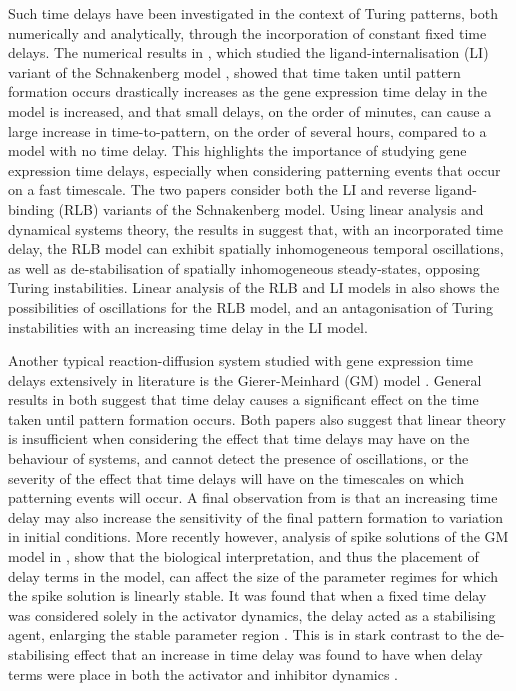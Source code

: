 Such time delays have been investigated in the context of Turing patterns, both numerically and analytically, through the incorporation of constant fixed time delays. The numerical results in \cite{gaffmonk}, which studied the ligand-internalisation (LI) variant of the Schnakenberg model \cite{schnakenberg}, showed that time taken until pattern formation occurs drastically increases as the gene expression time delay in the model is increased, and that small delays, on the order of minutes, can cause a large increase in time-to-pattern, on the order of several hours, compared to a model with no time delay. This highlights the importance of studying gene expression time delays, especially when considering patterning events that occur on a fast timescale. The two papers \cite{jiang, yigaffneyli} consider both the LI and reverse ligand-binding (RLB) variants of the Schnakenberg model. Using linear analysis and dynamical systems theory, the results in \cite{jiang} suggest that, with an incorporated time delay, the RLB model can exhibit spatially inhomogeneous temporal oscillations, as well as de-stabilisation of spatially inhomogeneous steady-states, opposing Turing instabilities. Linear analysis of the RLB and LI models in \cite{yigaffneyli} also shows the possibilities of oscillations for the RLB model, and an antagonisation of Turing instabilities with an increasing time delay in the LI model.

Another typical reaction-diffusion system studied with gene expression time delays extensively in literature is the Gierer-Meinhard (GM) model \cite{gm}.
General results in both \cite{leegaffney,leegaffmonk} suggest that time delay causes a significant effect on the time taken until pattern formation occurs. Both papers also suggest that linear theory is insufficient when considering the effect that time delays may have on the behaviour of systems, and cannot detect the presence of oscillations, or the severity of the effect that time delays will have on the timescales on which patterning events will occur. A final observation from \cite{gaffmonk,leegaffmonk} is that an increasing time delay may also increase the sensitivity of the final pattern formation to variation in initial conditions. More recently however, analysis of spike solutions of the GM model in \cite{fadai1,fadai2}, show that the biological interpretation, and thus the placement of delay terms in the model, can affect the size of the parameter regimes for which the spike solution is linearly stable. It was found that when a fixed time delay was considered solely in the activator dynamics, the delay acted as a stabilising agent, enlarging the stable parameter region \cite{fadai2}. This is in stark contrast to the de-stabilising effect that an increase in time delay was found to have when delay terms were place in both the activator and inhibitor dynamics \cite{fadai1}.

